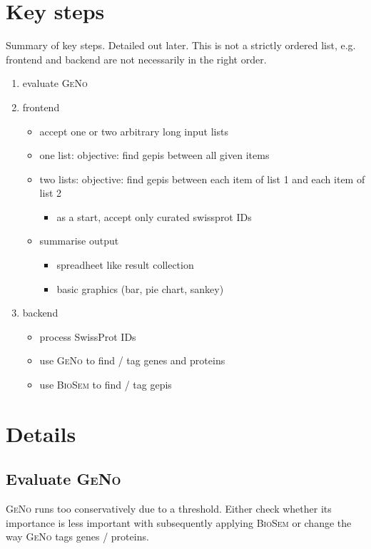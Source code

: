 \documentclass[a4paper,10pt]{article}
\begin{document}
  \section{Key steps}
  Summary of key steps. Detailed out later. This is not a strictly ordered list, e.g. frontend and backend are not necessarily in the right order.
  \begin{enumerate}
    \item evaluate \textsc{GeNo}
    \item frontend
    \begin{itemize}
      \item accept one or two arbitrary long input lists
      \item one list: objective: find gepis between all given items
      \item two lists: objective: find gepis between each item of list 1 and each item of list 2
      \begin{itemize}
	\item as a start, accept only curated swissprot IDs
      \end{itemize}
      \item summarise output
      \begin{itemize}
       \item spreadheet like result collection
       \item basic graphics (bar, pie chart, sankey)
      \end{itemize}      
    \end{itemize}
    \item backend
    \begin{itemize}
      \item process SwissProt IDs
      \item use \textsc{GeNo} to find / tag genes and proteins
      \item use \textsc{BioSem} to find / tag gepis
    \end{itemize}    
  \end{enumerate}
  
  \section{Details}
  \subsection{Evaluate \textsc{GeNo}}
  
  \textsc{GeNo} runs too conservatively due to a threshold. Either check whether its importance is less important with subsequently applying \textsc{BioSem} or change the way \textsc{GeNo} tags genes / proteins. 
  
\end{document}
